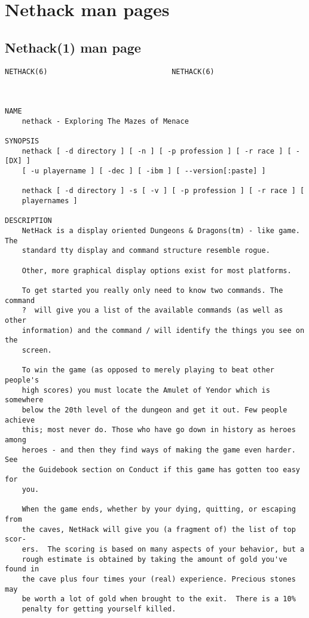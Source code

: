 \documentclass[11pt]{article}
\begin{document}
\section{Nethack man pages}
\label{sec:org1478834}

\subsection{Nethack(1) man page}
\label{sec:orgca2d871}

\begin{verbatim}
NETHACK(6)                             NETHACK(6)



NAME
    nethack - Exploring The Mazes of Menace

SYNOPSIS
    nethack [ -d directory ] [ -n ] [ -p profession ] [ -r race ] [ -[DX] ]
    [ -u playername ] [ -dec ] [ -ibm ] [ --version[:paste] ]

    nethack [ -d directory ] -s [ -v ] [ -p profession ] [ -r race ] [
    playernames ]

DESCRIPTION
    NetHack is a display oriented Dungeons & Dragons(tm) - like game. The
    standard tty display and command structure resemble rogue.

    Other, more graphical display options exist for most platforms.

    To get started you really only need to know two commands. The command
    ?  will give you a list of the available commands (as well as other
    information) and the command / will identify the things you see on the
    screen.

    To win the game (as opposed to merely playing to beat other people's
    high scores) you must locate the Amulet of Yendor which is somewhere
    below the 20th level of the dungeon and get it out. Few people achieve
    this; most never do. Those who have go down in history as heroes among
    heroes - and then they find ways of making the game even harder. See
    the Guidebook section on Conduct if this game has gotten too easy for
    you.

    When the game ends, whether by your dying, quitting, or escaping from
    the caves, NetHack will give you (a fragment of) the list of top scor-
    ers.  The scoring is based on many aspects of your behavior, but a
    rough estimate is obtained by taking the amount of gold you've found in
    the cave plus four times your (real) experience. Precious stones may
    be worth a lot of gold when brought to the exit.  There is a 10%
    penalty for getting yourself killed.


\end{verbatim}
\end{document}
